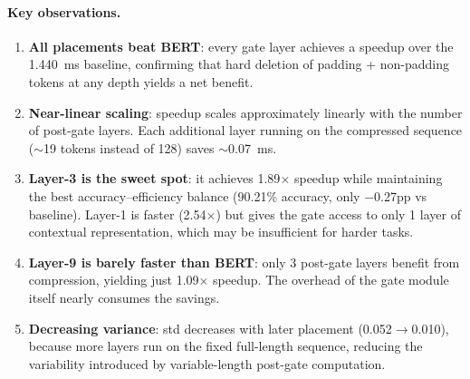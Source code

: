 \documentclass{article} %
\begin{document}
\paragraph{Key observations.}
\begin{enumerate}[nosep]
    \item \textbf{All placements beat BERT}: every gate layer achieves a speedup over the 1.440~ms baseline, confirming that hard deletion of padding + non-padding tokens at any depth yields a net benefit.
    \item \textbf{Near-linear scaling}: speedup scales approximately linearly with the number of post-gate layers. Each additional layer running on the compressed sequence ($\sim$19 tokens instead of 128) saves $\sim$0.07~ms.
    \item \textbf{Layer-3 is the sweet spot}: it achieves 1.89$\times$ speedup while maintaining the best accuracy--efficiency balance (90.21\% accuracy, only $-$0.27pp vs baseline). Layer-1 is faster (2.54$\times$) but gives the gate access to only 1 layer of contextual representation, which may be insufficient for harder tasks.
    \item \textbf{Layer-9 is barely faster than BERT}: only 3 post-gate layers benefit from compression, yielding just 1.09$\times$ speedup. The overhead of the gate module itself nearly consumes the savings.
    \item \textbf{Decreasing variance}: std decreases with later placement (0.052$\to$0.010), because more layers run on the fixed full-length sequence, reducing the variability introduced by variable-length post-gate computation.
\end{enumerate}
\end{document}
